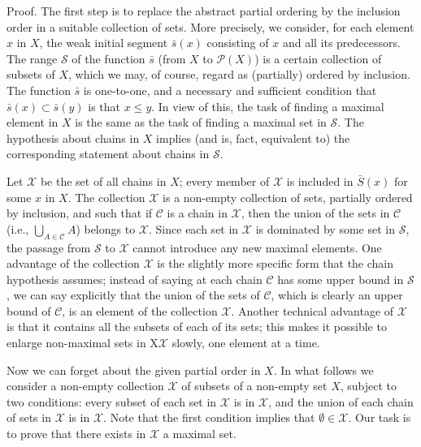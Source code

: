 Proof. The first step is to replace the abstract partial ordering by the inclusion order in a suitable collection of sets. More precisely, we consider, for each element $x$ in $X$, the weak initial segment $\bar{s}(x)$ consisting of $x$ and all its predecessors. The range $\mathcal{S}$ of the function $\bar{s}$ (from $X$ to $\mathcal{P}(X)$) is a certain collection of subsets of $X$, which we may, of course, regard as (partially) ordered by inclusion. The function $\bar{s}$ is one-to-one, and a necessary and sufficient condition that $\bar{s}(x) \subset \bar{s}(y)$ is that $x \le y$. In view of this, the task of finding a maximal element in $X$ is the same as the task of finding a maximal set in $\mathcal{S}$. The hypothesis about chains in $X$ implies (and is, fact, equivalent to) the corresponding statement about chains in $\mathcal{S}$. 

Let $\mathcal{X}$ be the set of all chains in $X$; every member of $\mathcal{X}$ is included in $\bar{S}(x)$ for some $x$ in $X$. The collection $\mathcal{X}$ is a non-empty collection of sets, partially ordered by inclusion, and such that if $\mathcal{C}$ is a chain in $\mathcal{X}$, then the union of the sets in $\mathcal{C}$ (i.e., $\bigcup_{A \in \mathcal{C}} A$) belongs to $\mathcal{X}$. Since each set in $\mathcal{X}$ is dominated by some set in $\mathcal{S}$, the passage from $\mathcal{S}$ to $\mathcal{X}$ cannot introduce any new maximal elements. One advantage of the collection $\mathcal{X}$ is the slightly more specific form that the chain hypothesis assumes; instead of saying at each chain $\mathcal{C}$ has some upper bound in $\mathcal{S}$, we can say explicitly that the union of the sets of $\mathcal{C}$, which is clearly an upper bound of $\mathcal{C}$, is an element of the collection $\mathcal{X}$. Another technical advantage of $\mathcal{X}$ is that it contains all the subsets of each of its sets; this makes it possible to enlarge non-maximal sets in X$\mathcal{X}$ slowly, one element at a time. 

Now we can forget about the given partial order in $X$. In what follows we consider a non-empty collection $\mathcal{X}$ of subsets of a non-empty set $X$, subject to two conditions: every subset of each set in $\mathcal{X}$ is in $\mathcal{X}$, and the union of each chain of sets in $\mathcal{X}$ is in $\mathcal{X}$. Note that the first condition implies that $\emptyset \in \mathcal{X}$. Our task is to prove that there exists in $\mathcal{X}$ a maximal set. 

